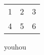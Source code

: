 \documentclass[a4paper,10pt]{article}
\begin{document}
\begin{tabular}{c|cc}
    1 & 2 & 3 \\
    4 & 5 & 6
\end{tabular}

youhou
\end{document}
